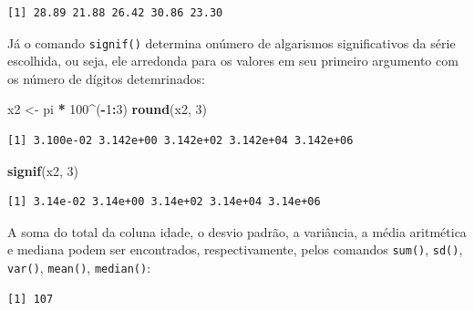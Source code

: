 \documentclass[12pt,brazil,oneside]{book}
\newenvironment{Shaded}{\begin{snugshade}}{\end{snugshade}}
\newcommand{\CommentTok}[1]{\textcolor[rgb]{0.56,0.35,0.01}{\textit{#1}}}
\newcommand{\DecValTok}[1]{\textcolor[rgb]{0.00,0.00,0.81}{#1}}
\newcommand{\KeywordTok}[1]{\textcolor[rgb]{0.13,0.29,0.53}{\textbf{#1}}}
\newcommand{\NormalTok}[1]{#1}
\newcommand{\OperatorTok}[1]{\textcolor[rgb]{0.81,0.36,0.00}{\textbf{#1}}}
\newcommand{\StringTok}[1]{\textcolor[rgb]{0.31,0.60,0.02}{#1}}
\begin{document}
\begin{verbatim}
[1] 28.89 21.88 26.42 30.86 23.30
\end{verbatim}

Já o comando \texttt{signif()} determina onúmero de algarismos
significativos da série escolhida, ou seja, ele arredonda para os
valores em seu primeiro argumento com os número de dígitos detemrinados:

\begin{Shaded}
\begin{Highlighting}[]
\NormalTok{x2 <-}\StringTok{ }\NormalTok{pi }\OperatorTok{*}\StringTok{ }\DecValTok{100}\OperatorTok{^}\NormalTok{(}\OperatorTok{-}\DecValTok{1}\OperatorTok{:}\DecValTok{3}\NormalTok{)}
\KeywordTok{round}\NormalTok{(x2, }\DecValTok{3}\NormalTok{)}
\end{Highlighting}
\end{Shaded}

\begin{verbatim}
[1] 3.100e-02 3.142e+00 3.142e+02 3.142e+04 3.142e+06
\end{verbatim}

\begin{Shaded}
\begin{Highlighting}[]
\KeywordTok{signif}\NormalTok{(x2, }\DecValTok{3}\NormalTok{) }
\end{Highlighting}
\end{Shaded}

\begin{verbatim}
[1] 3.14e-02 3.14e+00 3.14e+02 3.14e+04 3.14e+06
\end{verbatim}

A soma do total da coluna idade, o desvio padrão, a variância, a média
aritmética e mediana podem ser encontrados, respectivamente, pelos
comandos \texttt{sum()}, \texttt{sd()}, \texttt{var()}, \texttt{mean()},
\texttt{median()}:

\begin{Shaded}
\end{Shaded}

\begin{verbatim}
[1] 107
\end{verbatim}

\begin{Shaded}
\end{Shaded}
\end{document}
